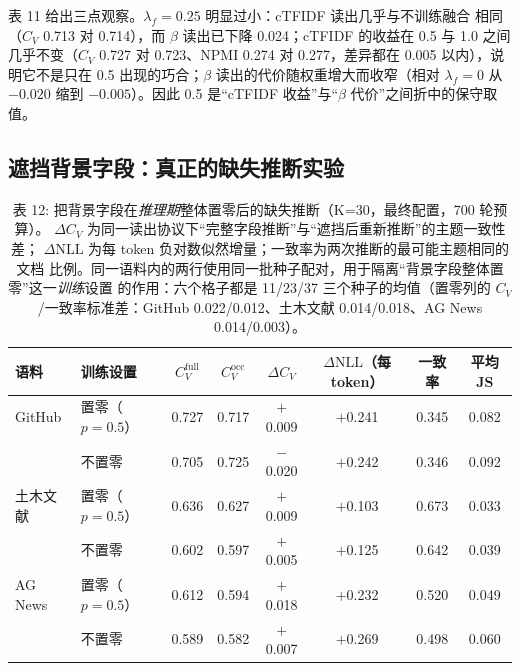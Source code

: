 \documentclass{article}
\begin{document}
表 11 给出三点观察。$\lambda_f=0.25$ 明显过小：cTFIDF 读出几乎与不训练融合
相同（$C_V$ 0.713 对 0.714），而 $\beta$ 读出已下降 0.024；cTFIDF 的收益在 0.5 与 1.0 之间
几乎不变（$C_V$ 0.727 对 0.723、NPMI 0.274 对 0.277，差异都在 0.005 以内），说明它不是只在
0.5 出现的巧合；$\beta$ 读出的代价随权重增大而收窄（相对 $\lambda_f=0$ 从 $-0.020$ 缩到
$-0.005$）。因此 0.5 是“cTFIDF 收益”与“$\beta$ 代价”之间折中的保守取值。

\subsection{遮挡背景字段：真正的缺失推断实验}


\begin{table}[t]
\centering
\caption{表 12: 把背景字段在\emph{推理期}整体置零后的缺失推断（K=30，最终配置，700 轮预算）。
$\Delta C_V$ 为同一读出协议下“完整字段推断”与“遮挡后重新推断”的主题一致性差；
$\Delta\mathrm{NLL}$ 为每 token 负对数似然增量；一致率为两次推断的最可能主题相同的文档
比例。同一语料内的两行使用同一批种子配对，用于隔离“背景字段整体置零”这一\emph{训练}设置
的作用：六个格子都是 11/23/37 三个种子的均值（置零列的 $C_V$/一致率标准差：GitHub
0.022/0.012、土木文献 0.014/0.018、AG News 0.014/0.003）。}
\label{tab:occlusion}
\small
\setlength{\tabcolsep}{4pt}
\begin{tabular}{llcccccc}
\toprule
语料 & 训练设置 & $C_V^{\mathrm{full}}$ & $C_V^{\mathrm{occ}}$ & $\Delta C_V$
 & $\Delta\mathrm{NLL}$（每 token） & 一致率 & 平均 JS \\
\midrule
GitHub & 置零（$p=0.5$） & 0.727 & 0.717 & $+$0.009 & $+$0.241 & 0.345 & 0.082 \\
       & 不置零 & 0.705 & 0.725 & $-$0.020 & $+$0.242 & 0.346 & 0.092 \\
\midrule
土木文献 & 置零（$p=0.5$） & 0.636 & 0.627 & $+$0.009 & $+$0.103 & 0.673 & 0.033 \\
        & 不置零 & 0.602 & 0.597 & $+$0.005 & $+$0.125 & 0.642 & 0.039 \\
\midrule
AG News & 置零（$p=0.5$） & 0.612 & 0.594 & $+$0.018 & $+$0.232 & 0.520 & 0.049 \\
        & 不置零 & 0.589 & 0.582 & $+$0.007 & $+$0.269 & 0.498 & 0.060 \\
\bottomrule
\end{tabular}
\end{table}
\end{document}
